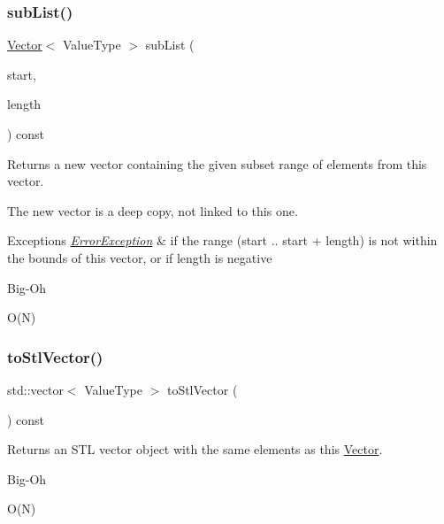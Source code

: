 \subsubsection{\texorpdfstring{sub\+List()}{subList()}}
{\footnotesize\ttfamily \mbox{\hyperlink{classVector}{Vector}}$<$ Value\+Type $>$ sub\+List (\begin{DoxyParamCaption}\item[{int}]{start,  }\item[{int}]{length }\end{DoxyParamCaption}) const}



Returns a new vector containing the given subset range of elements from this vector. 

The new vector is a deep copy, not linked to this one. 
\begin{DoxyExceptions}{Exceptions}
{\em \mbox{\hyperlink{classErrorException}{Error\+Exception}}} & if the range (start .. start + length) is not within the bounds of this vector, or if length is negative \\
\hline
\end{DoxyExceptions}
\begin{DoxyRefDesc}{Big-\/\+Oh}
\item[\mbox{\hyperlink{BigOh__BigOh000136}{Big-\/\+Oh}}]O(\+N) \end{DoxyRefDesc}
\mbox{\label{classVector_a091fed2dc0e91c838fe6e82088629897}} 
\subsubsection{\texorpdfstring{to\+Stl\+Vector()}{toStlVector()}}
{\footnotesize\ttfamily std\+::vector$<$ Value\+Type $>$ to\+Stl\+Vector (\begin{DoxyParamCaption}{ }\end{DoxyParamCaption}) const}



Returns an S\+TL vector object with the same elements as this \mbox{\hyperlink{classVector}{Vector}}. 

\begin{DoxyRefDesc}{Big-\/\+Oh}
\item[\mbox{\hyperlink{BigOh__BigOh000137}{Big-\/\+Oh}}]O(\+N) \end{DoxyRefDesc}
\mbox{\label{classVector_a1fe5121d6528fdea3f243321b3fa3a49}} 
